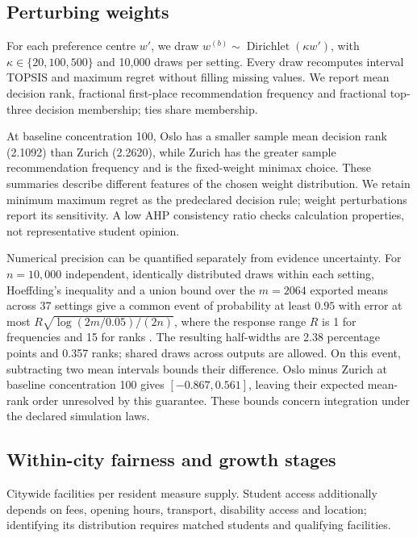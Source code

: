 \subsection{Perturbing weights}
For each preference centre $w'$, we draw
$w^{(b)}\sim\operatorname{Dirichlet}(\kappa w')$, with
$\kappa\in\{20,100,500\}$ and 10,000 draws per setting. Every draw recomputes
interval TOPSIS and maximum regret without filling missing values. We report
mean decision rank, fractional first-place recommendation frequency and
fractional top-three decision membership; ties share membership.





At baseline concentration 100, Oslo has a smaller sample mean decision rank (2.1092)
than Zurich (2.2620), while Zurich has the greater sample recommendation
frequency and is the fixed-weight minimax choice. These summaries describe
different features of the chosen weight distribution. We retain minimum maximum
regret as the predeclared decision rule; weight perturbations report its
sensitivity. A low AHP consistency ratio checks calculation properties,
not representative student opinion.

Numerical precision can be quantified separately from evidence uncertainty.
For $n=10{,}000$ independent, identically distributed draws within each setting,
Hoeffding's inequality and a union bound over the $m=2064$ exported means across
37 settings give a common event of probability at least $0.95$ with error
at most $R\sqrt{\log(2m/0.05)/(2n)}$, where the response range $R$ is 1 for
frequencies and 15 for ranks \cite{hoeffding}.
The resulting half-widths are 2.38 percentage points and 0.357 ranks;
shared draws across outputs are allowed. On this event, subtracting two mean
intervals bounds their difference. Oslo minus Zurich at baseline concentration
100 gives $[-0.867,0.561]$, leaving their expected mean-rank order unresolved
by this guarantee. These bounds concern integration under the declared
simulation laws.

\subsection{Within-city fairness and growth stages}
Citywide facilities per resident measure supply. Student access additionally
depends on fees, opening hours, transport, disability access and location;
identifying its distribution requires matched students and qualifying facilities.

